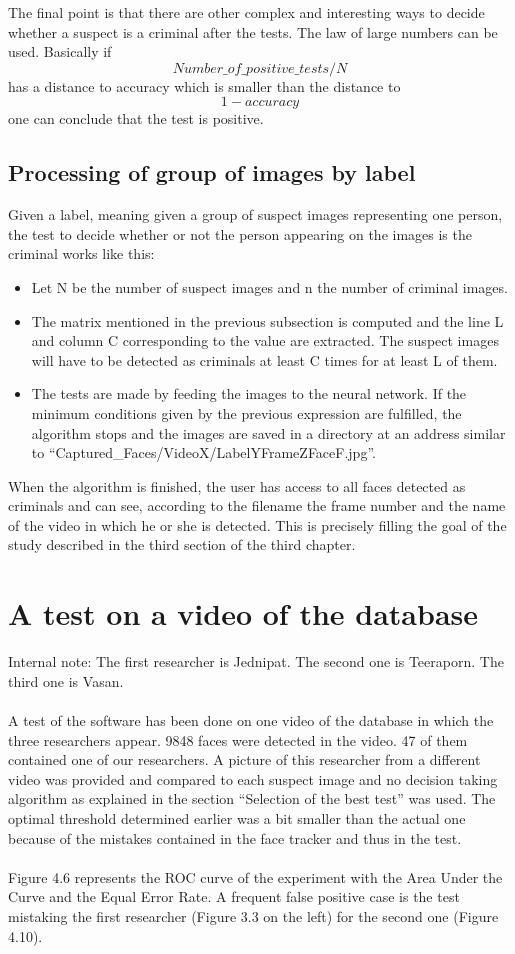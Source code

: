 The final point is that there are other complex and interesting ways to decide whether a suspect is a criminal after the tests. The law of large numbers can be used. Basically if \[Number\_of\_positive\_tests / N \] has a distance to accuracy which is smaller than the distance to \[1-accuracy\] one can conclude that the test is positive.

\subsection{Processing of group of images by label}
Given a label, meaning given a group of suspect images representing one person, the test to decide whether or not the person appearing on the images is the criminal works like this:
\begin{itemize}
\item Let N be the number of suspect images and n the number of criminal images.
\item The matrix mentioned in the previous subsection is computed and the line L and column C corresponding to the value are extracted. The suspect images will have to be detected as criminals at least C times for at least L of them.
\item The tests are made by feeding the images to the neural network. If the minimum conditions given by the previous expression are fulfilled, the algorithm stops and the images are saved in a directory at an address similar to \enquote{Captured\_Faces/VideoX/LabelYFrameZFaceF.jpg}.
\end{itemize} 

When the algorithm is finished, the user has access to all faces detected as criminals and can see, according to the filename the frame number and the name of the video in which he or she is detected. This is precisely filling the goal of the study described in the third section of the third chapter.

\section{A test on a video of the database}
Internal note: The first researcher is Jednipat. The second one is Teeraporn. The third one is Vasan.\\
\\
A test of the software has been done on one video of the database in which the three researchers appear.
9848 faces were detected in the video. 47 of them contained one of our researchers. A picture of this researcher from a different video was provided and compared to each suspect image and no decision taking algorithm as explained in the section \enquote{Selection of the best test} was used. The optimal threshold determined earlier was a bit smaller than the actual one because of the mistakes contained in the face tracker and thus in the test.\\
\\
Figure 4.6 represents the ROC curve of the experiment with the Area Under the Curve and the Equal Error Rate. A frequent false positive case is the test mistaking the first researcher (Figure 3.3 on the left) for the second one (Figure 4.10).

